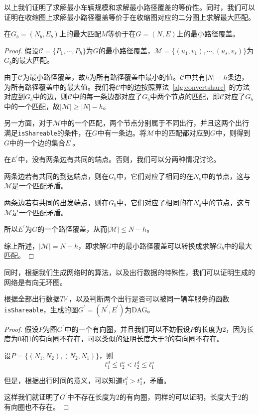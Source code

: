 \par
以上我们证明了求解最小车辆规模和求解最小路径覆盖的等价性。同时，我们可以证明在收缩图上求解最小路径覆盖等价于在收缩图对应的二分图上求解最大匹配。

\begin{theorem}
在$G_b = (N_b,E_b)$上的最大匹配$M$等价于在$G = (N,E)$上的最小路径覆盖。
\end{theorem}
\begin{proof}
假设$\mathcal{C} = \{P_1,\cdots, P_h\}$为$G$的最小路径覆盖，$\mathcal{M} = \{(u_1,v_1),\cdots, (u_s, v_s)\}$为$G_b$的最大匹配。
\par
由于$\mathcal{C}$为最小路径覆盖，故$h$为所有路径覆盖中最小的值。$\mathcal{C}$中共有$|N| - h$条边，为所有路径覆盖中的最大值。我们将$\mathcal{C}$中的边按照算法~\ref{alg:convertshare}~的方法对应到$G_b$中的边，则$\mathcal{C}$中的每一条边都对应了$G_b$中两个节点的匹配，即$\mathcal{C}$对应了$G_b$中的一个匹配，故$|\mathcal{M}| \geq |N| - h$。
\par
另一方面，对于$\mathcal{M}$中的一个匹配，两个节点分别属于不同出行，并且这两个出行满足\texttt{isShareable}的条件，在$G$中有一条边。将$\mathcal{M}$中的匹配都对应到$G$中，则得到$G$中的一个边的集合$E^\prime$。
\par
在$E^\prime$中，没有两条边有共同的端点。否则，我们可以分两种情况讨论。
\par
两条边若有共同的到达端点，则在$G_b$中，它们对应了相同的在$N_o$中的节点，这与$\mathcal{M}$是一个匹配矛盾。
\par
两条边若有共同的出发端点，则在$G_b$中，它们对应了相同的在$N_d$中的节点，这与$\mathcal{M}$是一个匹配矛盾。
\par
所以$E^\prime$为$G$的一个路径覆盖，从而$ |\mathcal{M}|\leq N-h$。
\par
综上所述，$|\mathcal{M}| = N - h$，即求解$G$中的最小路径覆盖可以转换成求解$G_b$中的最大匹配。
\end{proof}

\par
同时，根据我们生成网络时的算法，以及出行数据的特殊性，我们可以证明生成的网络是有向无环图。
\begin{theorem}
根据全部出行数据$Tr^\prime$，以及判断两个出行是否可以被同一辆车服务的函数\texttt{isShareable}，生成的图$G^\prime = (N^\prime,E^\prime)$为DAG。
\end{theorem}
\begin{proof}
假设$P$为图$G^\prime$中的一个有向圈，并且我们可以不妨假设$P$的长度为2，因为长度为0和1的有向圈不存在，可以类似的证明长度大于2的有向圈不存在。
\par
设$P = \{(N_1, N_2), (N_2, N_1)\}$，则
\[
  t_1^d \leq t_2^o < t_2^d \leq t_1^o
\]
\par
但是，根据出行时间的意义，可以知道$t_1^d > t_1^o$，矛盾。
\par
这样我们就证明了$G^\prime$中不存在长度为2的有向圈，同样的可以证明，长度大于2的有向圈也不存在。
\end{proof}

